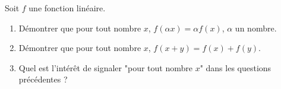 
Soit $f$ une fonction linéaire.
\begin{enumerate}
\item Démontrer que pour tout nombre $x$, $f(\alpha x)= \alpha f(x)$, $\alpha$ un nombre.
\item Démontrer que pour tout nombre $x$, $f(x+y)= f(x)+f(y)$.
\item Quel est l'intérêt de signaler "pour tout nombre $x$" dans les questions précédentes ?
\end{enumerate}
